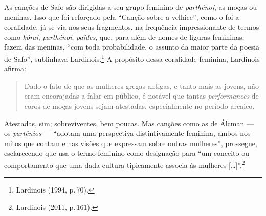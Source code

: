As canções de Safo são dirigidas a seu grupo feminino de \emph{parthénoi}, as moças ou meninas. Isso que foi reforçado pela “Canção sobre a velhice”, como o foi a coralidade, já se via nos seus fragmentos, na frequência impressionante de termos como \emph{kórai}, \emph{parthénoi}, \emph{paîdes}, que, para além de nomes de figuras femininas, fazem das meninas, “com toda probabilidade, o assunto da maior parte da poesia de Safo”, sublinhava Lardinois.\footnote{Lardinois (1994, p.\,70).} A propósito dessa coralidade feminina, Lardinois afirma:

\begin{quote}
Dado o fato de que as mulheres gregas antigas, e tanto mais as jovens, não eram encorajadas a falar em público, é notável que tantas \emph{performances} de coros de moças jovens sejam atestadas, especialmente no período arcaico.
\end{quote}

Atestadas, sim; sobreviventes, bem poucas. Mas canções como as de Álcman --- os \emph{partênios} --- ``adotam uma perspectiva distintivamente feminina, ambos nos mitos que contam e nas visões que expressam sobre outras mulheres'', prossegue, esclarecendo que usa o termo feminino como designação para ``um conceito ou comportamento que uma dada cultura tipicamente associa às mulheres {[}\ldots{}{]}''.\footnote{Lardinois (2011, p.\,161).}

